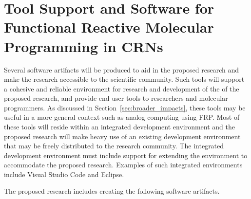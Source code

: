 
\section{Tool Support and Software for Functional Reactive Molecular Programming in CRNs}
\label{sec:software_support}

Several software artifacts will be produced to aid in the proposed research and make the research accessible to the scientific community.  Such tools will support a cohesive and reliable environment for research and development of the of the proposed research, and provide end-user tools to researchers and molecular programmers.  As discussed in Section~\ref{sec:broader_impacts}, these tools may be useful in a more general context such as analog computing using FRP.
Most of these tools will reside within an integrated development environment and the proposed research will make heavy use of an existing development environment that may be freely distributed to the research community.
The integrated development environment must include support for extending the environment to accommodate the proposed research.
Examples of such integrated environments include Visual Studio Code and Eclipse.

The proposed research includes creating the following software artifacts.

